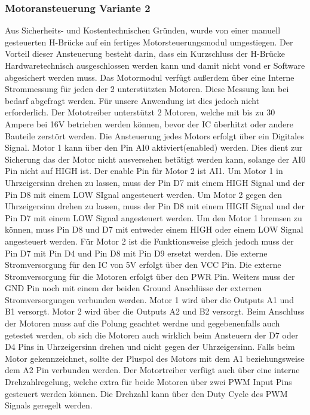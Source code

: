 \subsubsection{Motoransteuerung Variante 2}
Aus Sicherheits- und Kostentechnischen Gründen, wurde von einer manuell gesteuerten H-Brücke auf ein fertiges Motorsteuerungsmodul umgestiegen. Der Vorteil dieser Ansteuerung besteht darin, dass ein Kurzschluss der H-Brücke Hardwaretechnisch ausgeschlossen werden kann und damit nicht vond er Software abgesichert werden muss. Das Motormodul verfügt außerdem über eine Interne Strommessung für jeden der 2 unterstützten Motoren. Diese Messung kan bei bedarf abgefragt werden. Für unsere Anwendung ist dies jedoch nicht erforderlich. Der Mototreiber unterstützt 2 Motoren, welche mit bis zu 30 Ampere bei 16V betrieben werden können, bevor der IC überhitzt oder andere Bauteile zerstört werden. Die Ansteuerung jedes Motors erfolgt über ein Digitales Signal. Motor 1 kann über den Pin AI0 aktiviert(enabled) werden. Dies dient zur Sicherung das der Motor nicht ausversehen betätigt werden kann, solange der AI0 Pin nicht auf HIGH ist. Der enable Pin für Motor 2 ist AI1. Um Motor 1 in Uhrzeigersinn drehen zu lassen, muss der Pin D7 mit einem HIGH Signal und der Pin D8 mit einem LOW SIgnal angesteuert werden. Um Motor 2 gegen den Uhrzeigersinn drehen zu lassen, muss der Pin D8 mit einem HIGH Signal und der Pin D7 mit einem LOW Signal angesteuert werden. Um den Motor 1 bremsen zu können, muss Pin D8 und D7 mit entweder einem HIGH oder einem LOW Signal angesteuert werden. Für Motor 2 ist die Funktionsweise gleich jedoch muss der Pin D7 mit Pin D4 und Pin D8 mit Pin D9 ersetzt werden. Die externe Stromversorgung für den IC von 5V erfolgt über den VCC Pin. Die externe Stromversorgung für die Motoren erfolgt über den PWR Pin. Weiters muss der GND Pin noch mit einem der beiden Ground Anschlüsse der externen Stromversorgungen verbunden werden. Motor 1 wird über die Outputs A1 und B1 versorgt. Motor 2 wird über die Outputs A2 und B2 versorgt. Beim Anschluss der Motoren muss auf die Polung geachtet werdne und gegebenenfalls auch getestet werden, ob sich die Motoren auch wirklich beim Ansteuern der D7 oder D4 Pins in Uhrzeigersinn drehen und nicht gegen der Uhrzeigersinn. Falls beim Motor gekennzeichnet, sollte der Pluspol des Motors mit dem A1 beziehungsweise dem A2 Pin verbunden werden. Der Motortreiber verfügt auch über eine interne Drehzahlregelung, welche extra für beide Motoren über zwei PWM Input Pins gesteuert werden können. Die Drehzahl kann über den Duty Cycle des PWM Signals geregelt werden.
